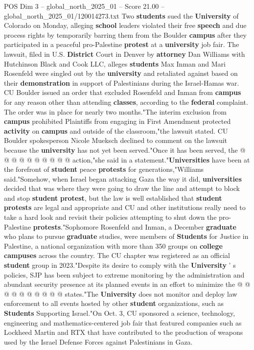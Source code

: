 \begin{textsample}{POS Dim 3 – global\_north\_2025\_01 – Score 21.00 – global\_north\_2025\_01/120014273.txt}  \label{ex:f3_pos_240}
Two \textbf{students} sued the \textbf{University} of Colorado on Monday, alleging \textbf{school} leaders violated their free \textbf{speech} and due process rights by temporarily barring them from the Boulder \textbf{campus} after they participated in a peaceful pro-Palestine \textbf{protest} at a \textbf{university} job fair.
The lawsuit, filed in U.S. \textbf{District} Court in Denver by \textbf{attorney} Dan Williams with Hutchinson Black and Cook LLC, alleges \textbf{students} Max Inman and Mari Rosenfeld were singled out by the \textbf{university} and retaliated against based on their \textbf{demonstration} in support of Palestinians during the Israel-Hamas war.
CU Boulder issued an order that excluded Rosenfeld and Inman from \textbf{campus} for any reason other than attending \textbf{classes}, according to the \textbf{federal} complaint.
The order was in place for nearly two months."The interim exclusion from \textbf{campus} prohibited Plaintiffs from engaging in First Amendment protected \textbf{activity} on \textbf{campus} and outside of the classroom,"the lawsuit stated.
CU Boulder spokesperson Nicole Mueksch declined to comment on the lawsuit because the \textbf{university} has not yet been served."Once it has been served, the @ @ @ @ @ @ @ @ @ @ action,"she said in a statement."\textbf{Universities} have been at the forefront of \textbf{student} peace \textbf{protests} for generations,"Williams said."Somehow, when Israel began attacking Gaza the way it did, \textbf{universities} decided that was where they were going to draw the line and attempt to block and stop \textbf{student} \textbf{protest}, but the law is well established that \textbf{student} \textbf{protests} are legal and appropriate and CU and other institutions really need to take a hard look and revisit their policies attempting to shut down the pro-Palestine \textbf{protests}."Sophomore Rosenfeld and Inman, a December \textbf{graduate} who plans to pursue \textbf{graduate} studies, were members of \textbf{Students} for Justice in Palestine, a national organization with more than 350 groups on \textbf{college} \textbf{campuses} across the country.
The CU chapter was registered as an official \textbf{student} group in 2023."Despite its desire to comply with the \textbf{University} ' s policies, SJP has been subject to extreme monitoring by the administration and abundant security presence at its planned events in an effort to minimize the @ @ @ @ @ @ @ @ @ @ states."The \textbf{University} does not monitor and deploy law enforcement to all events hosted by other \textbf{student} organizations, such as \textbf{Students} Supporting Israel."On Oct. 3, CU sponsored a science, technology, engineering and mathematics-centered job fair that featured companies such as Lockheed Martin and RTX that have contributed to the production of weapons used by the Israel Defense Forces against Palestinians in Gaza.

\end{textsample}

